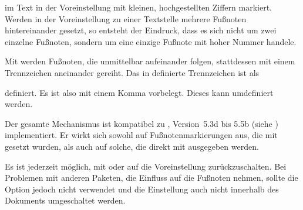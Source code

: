 \begin{Declaration}
\end{Declaration}
%
im Text in der Voreinstellung mit kleinen,
hochgestellten Ziffern markiert. Werden in der
Voreinstellung
 zu einer Textstelle mehrere Fußnoten
hintereinander gesetzt, so entsteht der Eindruck, dass es sich nicht um zwei
einzelne Fußnoten, sondern um eine einzige Fußnote mit hoher Nummer handele.

Mit
 werden
Fußnoten, die unmittelbar aufeinander folgen, stattdessen mit einem
Trennzeichen aneinander gereiht. Das in
 definierte Trennzeichen ist
als
\begin{lstcode}
  \newcommand*{\multfootsep}{,}
\end{lstcode}
definiert. Es ist also mit einem Komma vorbelegt. Dieses kann umdefiniert
werden.

Der gesamte Mechanismus ist kompatibel zu
,
Version~5.3d bis 5.5b (siehe \cite{package:footmisc}) implementiert. Er wirkt
sich sowohl auf Fußnotenmarkierungen aus, die mit
 gesetzt wurden,
als auch auf solche, die direkt mit
ausgegeben werden.

Es ist jederzeit möglich, mit 
oder  auf die Voreinstellung
 zurückzuschalten. Bei Problemen mit
anderen Paketen, die Einfluss auf die Fußnoten nehmen, sollte die Option
jedoch nicht verwendet und die Einstellung auch nicht innerhalb des Dokuments
umgeschaltet werden.


